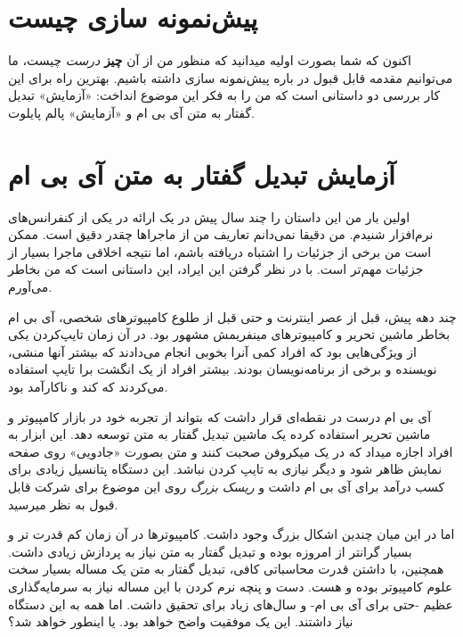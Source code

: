 \section{پیش‌نمونه سازی
چیست}\label{ux67eux6ccux634ux646ux645ux648ux646ux647-ux633ux627ux632ux6cc-ux686ux6ccux633ux62a}

اکنون که شما بصورت اولیه میدانید که منظور من از آن \textbf{چیز}
\emph{درست} چیست، ما می‌توانیم مقدمه قابل قبول در باره پیش‌نمونه سازی
داشته باشیم. بهترین راه برای این کار بررسی دو داستانی است که من را به
فکر این موضوع انداخت: «آزمایش» تبدیل گفتار به متن آی بی ام و «آزمایش»
پالم پایلوت.

\section{آزمایش تبدیل گفتار به متن آی بی
ام}\label{ux622ux632ux645ux627ux6ccux634-ux62aux628ux62fux6ccux644-ux6afux641ux62aux627ux631-ux628ux647-ux645ux62aux646-ux622ux6cc-ux628ux6cc-ux627ux645}

اولین بار من این داستان را چند سال پیش در یک ارائه در یکی از کنفرانس‌های
نرم‌افزار شنیدم. من دقیقا نمی‌دانم تعاریف من از ماجراها چقدر دقیق است.
ممکن است من برخی از جزئیات را اشتباه دریافته باشم، اما نتیجه اخلاقی
ماجرا بسیار از جزئیات مهم‌تر است. با در نظر گرفتن این ایراد، این داستانی
است که من بخاطر می‌آورم.

چند دهه پیش، قبل از عصر اینترنت و حتی قبل از طلوع کامپیوترهای شخصی، آی
بی ام بخاطر ماشین تحریر و کامپیوترهای مینفریمش مشهور بود. در آن زمان
تایپ‌کردن یکی از ویژگی‌هایی بود که افراد کمی آنرا بخوبی انجام می‌دادند
که بیشتر آنها منشی، نویسنده و برخی از برنامه‌نویسان بودند. بیشتر افراد
از یک انگشت برا تایپ استفاده می‌کردند که کند و ناکارآمد بود.

آی بی ام درست در نقطه‌ای قرار داشت که بتواند از تجربه خود در بازار
کامپیوتر و ماشین تحریر استفاده کرده یک ماشین تبدیل گفتار به متن توسعه
دهد. این ابزار به افراد اجازه میداد که در یک میکروفن صحبت کنند و متن
بصورت «جادویی» روی صفحه نمایش ظاهر شود و دیگر نیازی به تایپ کردن نباشد.
این دستگاه پتانسیل زیادی برای کسب درآمد برای آی بی ام داشت و \emph{ریسک
بزرگ} روی این موضوع برای شرکت قابل قبول به نظر میرسید.

اما در این میان چندین اشکال بزرگ وجود داشت. کامپیوترها در آن زمان کم
قدرت تر و بسیار گرانتر از امروزه بوده و تبدیل گفتار به متن نیاز به
پردازش زیادی داشت. همچنین، با داشتن قدرت محاسباتی کافی، تبدیل گفتار به
متن یک مساله بسیار سخت علوم کامپیوتر بوده و هست. دست و پنچه نرم کردن با
این مساله نیاز به سرمایه‌گذاری عظیم -حتی برای آی بی ام- و سال‌های زیاد
برای تحقیق داشت. اما همه به این دستگاه نیاز داشتند. این یک موفقیت واضح
خواهد بود. یا اینطور خواهد شد؟

